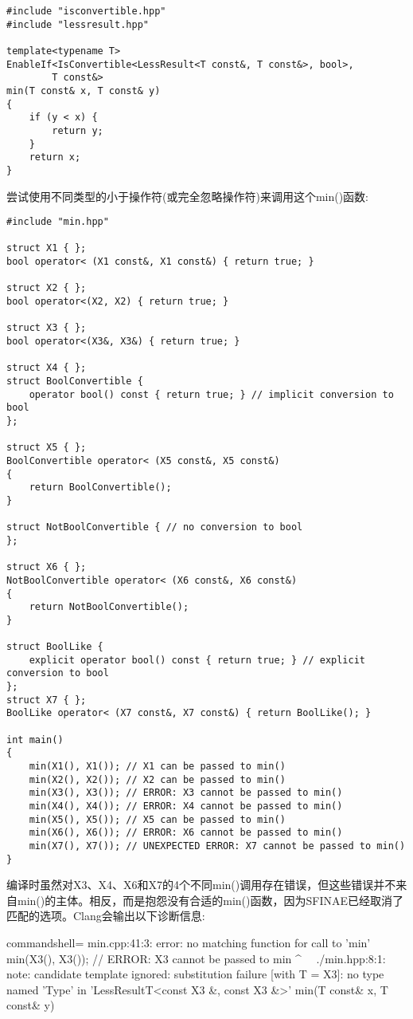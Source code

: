 \begin{lstlisting}[style=styleCXX]
#include "isconvertible.hpp"
#include "lessresult.hpp"

template<typename T>
EnableIf<IsConvertible<LessResult<T const&, T const&>, bool>,
		T const&>
min(T const& x, T const& y)
{
	if (y < x) {
		return y;
	}
	return x;
}
\end{lstlisting}

尝试使用不同类型的小于操作符(或完全忽略操作符)来调用这个min()函数:

\begin{lstlisting}[style=styleCXX]
#include "min.hpp"

struct X1 { };
bool operator< (X1 const&, X1 const&) { return true; }

struct X2 { };
bool operator<(X2, X2) { return true; }

struct X3 { };
bool operator<(X3&, X3&) { return true; }

struct X4 { };
struct BoolConvertible {
	operator bool() const { return true; } // implicit conversion to bool
};

struct X5 { };
BoolConvertible operator< (X5 const&, X5 const&)
{
	return BoolConvertible();
}

struct NotBoolConvertible { // no conversion to bool
};

struct X6 { };
NotBoolConvertible operator< (X6 const&, X6 const&)
{
	return NotBoolConvertible();
}

struct BoolLike {
	explicit operator bool() const { return true; } // explicit conversion to bool
};
struct X7 { };
BoolLike operator< (X7 const&, X7 const&) { return BoolLike(); }

int main()
{
	min(X1(), X1()); // X1 can be passed to min()
	min(X2(), X2()); // X2 can be passed to min()
	min(X3(), X3()); // ERROR: X3 cannot be passed to min()
	min(X4(), X4()); // ERROR: X4 cannot be passed to min()
	min(X5(), X5()); // X5 can be passed to min()
	min(X6(), X6()); // ERROR: X6 cannot be passed to min()
	min(X7(), X7()); // UNEXPECTED ERROR: X7 cannot be passed to min()
}
\end{lstlisting}

编译时虽然对X3、X4、X6和X7的4个不同min()调用存在错误，但这些错误并不来自min()的主体。相反，而是抱怨没有合适的min()函数，因为SFINAE已经取消了匹配的选项。Clang会输出以下诊断信息:

\begin{tcblisting}{commandshell={}}
min.cpp:41:3: error: no matching function for call to ’min’
min(X3(), X3()); // ERROR: X3 cannot be passed to min
^~~
./min.hpp:8:1: note: candidate template ignored: substitution failure
[with T = X3]: no type named ’Type’ in
’LessResultT<const X3 &, const X3 &>’
min(T const& x, T const& y)
\end{tcblisting}

